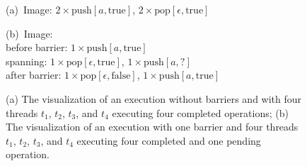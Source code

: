 \begin{figure}[t]
  \scriptsize
  \begin{minipage}{0.5\linewidth}
    \hspace{-13mm}
    
    {\footnotesize (a)}~Image:
    $2\times\mathrm{push}[a,\mathrm{true}]$,
    $2\times\mathrm{pop}[\epsilon,\mathrm{true}]$
  \end{minipage}
  \begin{minipage}{0.5\linewidth}
    \hspace{-10mm}
    
    {\footnotesize (b)}~Image:\\
    before barrier: $1\times\mathrm{push}[a,\mathrm{true}]$ \\
    spanning: $1\times\mathrm{pop}[\epsilon,\mathrm{true}]$, 
      $1\times\mathrm{push}[a,?]$ \\
    after barrier: $1\times\mathrm{pop}[\epsilon,\mathrm{false}]$, 
      $1\times\mathrm{push}[a,\mathrm{true}]$
  \end{minipage}
  \caption{(a) The visualization of an execution without barriers and with four 
    threads $t_1$, $t_2$, $t_3$, and $t_4$ executing four completed operations;
    (b) The visualization of an execution with one barrier and four threads 
    $t_1$, $t_2$, $t_3$, and $t_4$ executing four completed and one pending 
    operation.}
  \label{fig:no-barrier}
\end{figure}


